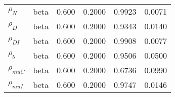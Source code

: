 \begin{center}
\begin{longtable}{llcccc}
${\rho_N}$ & beta &   0.600 & 0.2000 &   0.9923 &  0.0071 \\ 
${\rho_D}$ & beta &   0.600 & 0.2000 &   0.9343 &  0.0140 \\ 
${\rho_{DI}}$ & beta &   0.600 & 0.2000 &   0.9908 &  0.0077 \\ 
${\rho_b}$ & beta &   0.600 & 0.2000 &   0.9506 &  0.0500 \\ 
${\rho_{muC}}$ & beta &   0.600 & 0.2000 &   0.6736 &  0.0990 \\ 
${\rho_{muI}}$ & beta &   0.600 & 0.2000 &   0.9747 &  0.0146 \\ 
\end{longtable}
 \end{center}
